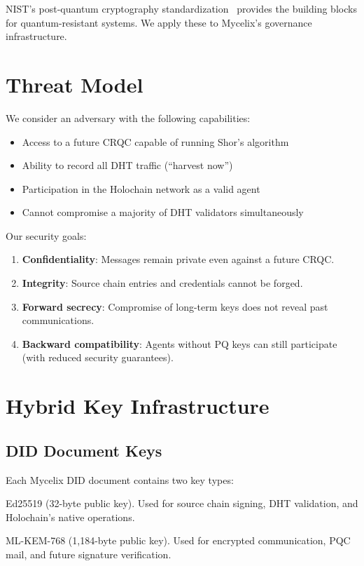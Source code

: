 \documentclass[11pt,twocolumn]{article}
\begin{document}
NIST's post-quantum cryptography standardization~\cite{nist2024pqc} provides
the building blocks for quantum-resistant systems. We apply these to Mycelix's
governance infrastructure.

\section{Threat Model}

We consider an adversary with the following capabilities:

\begin{itemize}[nosep]
  \item Access to a future CRQC capable of running Shor's algorithm
  \item Ability to record all DHT traffic (``harvest now'')
  \item Participation in the Holochain network as a valid agent
  \item Cannot compromise a majority of DHT validators simultaneously
\end{itemize}

Our security goals:

\begin{enumerate}[nosep]
  \item \textbf{Confidentiality}: Messages remain private even against a
    future CRQC.
  \item \textbf{Integrity}: Source chain entries and credentials cannot be
    forged.
  \item \textbf{Forward secrecy}: Compromise of long-term keys does not
    reveal past communications.
  \item \textbf{Backward compatibility}: Agents without PQ keys can still
    participate (with reduced security guarantees).
\end{enumerate}

\section{Hybrid Key Infrastructure}

\subsection{DID Document Keys}

Each Mycelix DID document contains two key types:

\begin{description}[nosep]
  \item[Authentication] Ed25519 (32-byte public key). Used for source chain
    signing, DHT validation, and Holochain's native operations.
  \item[Key Agreement] ML-KEM-768 (1,184-byte public key). Used for encrypted
    communication, PQC mail, and future signature verification.
\end{description}
\end{document}
